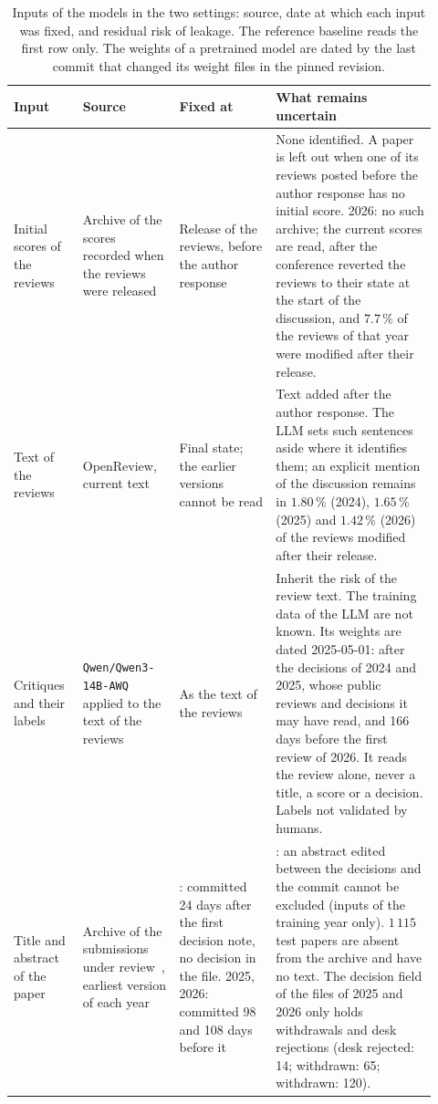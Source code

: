 \begin{table}[t]
\centering
\footnotesize
\setlength{\tabcolsep}{4pt}
\caption{Inputs of the models in the two settings: source, date at which each input was fixed, and residual risk of leakage. The reference baseline reads the first row only. The weights of a pretrained model are dated by the last commit that changed its weight files in the pinned revision.}
\label{tab:input-audit}
\begin{tabular}{@{}>{\raggedright\arraybackslash}p{0.15\linewidth}>{\raggedright\arraybackslash}p{0.21\linewidth}>{\raggedright\arraybackslash}p{0.21\linewidth}>{\raggedright\arraybackslash}p{0.35\linewidth}@{}}
\toprule
Input & Source & Fixed at & What remains uncertain \\
\midrule
Initial scores of the reviews & Archive of the scores recorded when the reviews were released~\cite{kargaran2025insights} & Release of the reviews, before the author response & None identified. A paper is left out when one of its reviews posted before the author response has no initial score. 2026: no such archive; the current scores are read, after the conference reverted the reviews to their state at the start of the discussion, and $7.7\,\%$ of the reviews of that year were modified after their release. \\
Text of the reviews & OpenReview, current text & Final state; the earlier versions cannot be read & Text added after the author response. The LLM sets such sentences aside where it identifies them; an explicit mention of the discussion remains in $1.80\,\%$ (2024), $1.65\,\%$ (2025) and $1.42\,\%$ (2026) of the reviews modified after their release. \\
Critiques and their labels & \texttt{Qwen/Qwen3-14B-AWQ} applied to the text of the reviews & As the text of the reviews & Inherit the risk of the review text. The training data of the LLM are not known. Its weights are dated 2025-05-01: after the decisions of 2024 and 2025, whose public reviews and decisions it may have read, and 166 days before the first review of 2026. It reads the review alone, never a title, a score or a decision. Labels not validated by humans. \\
Title and abstract of the paper & Archive of the submissions under review~\cite{gonzalez2024iclr}, earliest version of each year & 2024: committed 24 days after the first decision note, no decision in the file. 2025, 2026: committed 98 and 108 days before it & 2024: an abstract edited between the decisions and the commit cannot be excluded (inputs of the training year only). $1\,115$ test papers are absent from the archive and have no text. The decision field of the files of 2025 and 2026 only holds withdrawals and desk rejections (desk rejected: 14; withdrawn: 65; withdrawn: 120). \\

\end{tabular}
\end{table}
